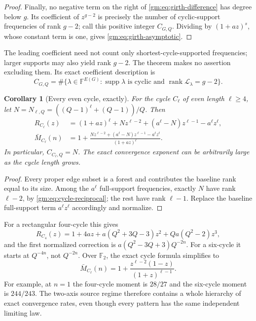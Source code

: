 \documentclass[11pt,a4paper]{article}
\numberwithin{equation}{section}
\newtheorem{corollary}[theorem]{Corollary}
\theoremstyle{definition}
\theoremstyle{remark}
\newcommand{\F}{\mathbb F}
\newcommand{\1}{\mathbf 1}
\newcommand{\rank}{\operatorname{rank}}
\newcommand{\supp}{\operatorname{supp}}
\begin{document}
\begin{proof}
Finally, no negative term on the right of
\eqref{gm:eq:girth-difference} has degree below $g$. Its coefficient of
$z^{g-2}$ is precisely the number of cyclic-support frequencies of rank
$g-2$; call this positive integer $C_{G,Q}$. Dividing by $(1+az)^s$, whose
constant term is one, gives \eqref{gm:eq:girth-asymptotic}.
\end{proof}

The leading coefficient need not count only shortest-cycle-supported
frequencies; larger supports may also yield rank $g-2$. The theorem makes
no assertion excluding them. Its exact coefficient description is
\[
 C_{G,Q}=\#\{\lambda\in\F^{E(G)}:\supp\lambda\text{ is cyclic and }
                              \rank\mathcal L_\lambda=g-2\}.
\]

\begin{corollary}[Every even cycle, exactly]\label{gm:cor:cycle-exact}
For the cycle $C_\ell$ of even length $\ell\geq4$, let
$N=N_{\ell,Q}=((Q-1)^\ell+(Q-1))/Q$. Then
\begin{align}
 R_{C_\ell}(z)
   &=(1+az)^\ell+N z^{\ell-2}+(a^\ell-N)z^{\ell-1}-a^\ell z^\ell,
          \label{gm:eq:cycle-enumerator}\\
 \bar M_{C_\ell}(n)
   &=1+\frac{N z^{\ell-2}+(a^\ell-N)z^{\ell-1}-a^\ell z^\ell}
                  {(1+az)^\ell}.
          \label{gm:eq:cycle-moment}
\end{align}
In particular, $C_{C_\ell,Q}=N$. The exact convergence exponent can be
arbitrarily large as the cycle length grows.
\end{corollary}

\begin{proof}
Every proper edge subset is a forest and contributes the baseline rank
equal to its size. Among the $a^\ell$ full-support frequencies, exactly
$N$ have rank $\ell-2$, by \eqref{gm:eq:cycle-reciprocal}; the rest have
rank $\ell-1$. Replace the baseline full-support term
$a^\ell z^\ell$ accordingly and normalize.
\end{proof}

For a rectangular four-cycle this gives
\[
 R_{C_4}(z)=1+4az+a(Q^2+3Q-3)z^2+Qa(Q^2-2)z^3,
\]
and the first normalized correction is
$a(Q^2-3Q+3)Q^{-2n}$. For a six-cycle it starts at $Q^{-4n}$, not
$Q^{-2n}$. Over $\F_2$, the exact cycle formula simplifies to
\[
 \bar M_{C_\ell}(n)
    =1+\frac{z^{\ell-2}(1-z)}{(1+z)^{\ell-1}}.
\]
For example, at $n=1$ the four-cycle moment is $28/27$ and the six-cycle
moment is $244/243$. The two-axis source regime therefore contains a
whole hierarchy of exact convergence rates, even though every pattern
has the same independent limiting law.
\end{document}
